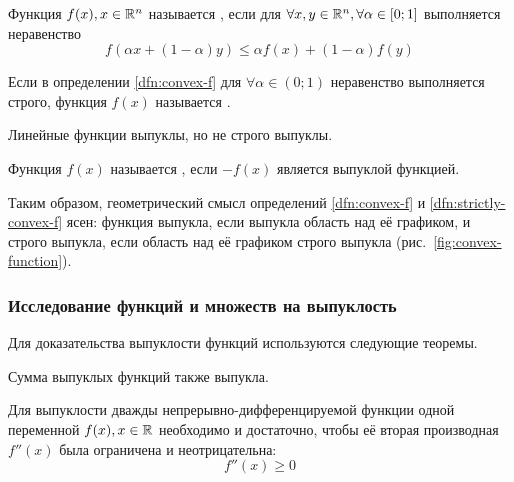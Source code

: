 \begin{dfn}
  \label{dfn:convex-f}
  Функция $f(x), x \in \mathbb{R}^n$ называется , если
  для $\forall x, y \in \mathbb{R}^n, \forall \alpha \in [0;1]$
  выполняется неравенство
  \begin{equation*}
    f(\alpha x + (1-\alpha)y) \leq \alpha f(x) + (1-\alpha) f(y)
  \end{equation*}
\end{dfn}
\begin{dfn}
  \label{dfn:strictly-convex-f}
  Если в определении \ref{dfn:convex-f} для $\forall \alpha \in (0;1)$
  неравенство выполняется строго, функция $f(x)$ называется
  .
\end{dfn}
\begin{rem}
  \label{rem:lin-f-convex}
  Линейные функции выпуклы, но не строго выпуклы.
\end{rem}
\begin{dfn}
  Функция $f(x)$ называется , если $-f(x)$ является
  выпуклой функцией.
\end{dfn}

Таким образом, геометрический смысл определений \ref{dfn:convex-f} и
\ref{dfn:strictly-convex-f} ясен: функция выпукла, если выпукла
область над её графиком, и строго выпукла, если область над её
графиком строго выпукла (рис. \ref{fig:convex-function}).



\subsubsection{Исследование функций и множеств на выпуклость}

Для доказательства выпуклости функций используются следующие теоремы.

\begin{thm}
  \label{th:convex-f-sum}
  Сумма выпуклых функций также выпукла.
\end{thm}

\begin{thm}
  \label{th:convex-f-diff2}
  Для выпуклости дважды непрерывно-дифференцируемой функции одной
  переменной $f(x), x \in \mathbb{R}$ необходимо и достаточно, чтобы её
  вторая производная $f''(x)$ была ограничена и неотрицательна:
  \begin{equation*}
    f''(x) \geq 0
  \end{equation*}
\end{thm}

